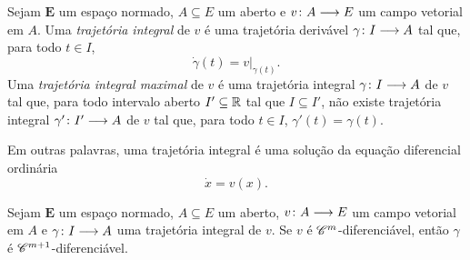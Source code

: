 \begin{definition}
Sejam $\bm E$ um espaço normado, $A \subseteq E$ um aberto e ${v}\colon {A} \longrightarrow {E}$ um campo vetorial em $A$. Uma \emph{trajetória integral} de $v$ é uma trajetória derivável ${\gamma}\colon {I} \longrightarrow {A}$ tal que, para todo $t \in I$,
	\begin{equation*}
	\dot \gamma(t) = v|_{\gamma(t)}.
	\end{equation*}
Uma \emph{trajetória integral maximal} de $v$ é uma trajetória integral ${\gamma}\colon {I} \longrightarrow {A}$ de $v$ tal que, para todo intervalo aberto $I' \subseteq \mathbb{R}$ tal que $I \subseteq I'$, não existe trajetória integral ${\gamma'}\colon {I'} \longrightarrow {A}$ de $v$ tal que, para todo $t \in I$, $\gamma'(t) = \gamma(t)$.
\end{definition}

Em outras palavras, uma trajetória integral é uma solução da equação diferencial ordinária
	\begin{equation*}
	\dot x = v(x).
	\end{equation*}

\begin{proposition}
Sejam $\bm E$ um espaço normado, $A \subseteq E$ um aberto, ${v}\colon {A} \longrightarrow {E}$ um campo vetorial em $A$ e ${\gamma}\colon {I} \longrightarrow {A}$ uma trajetória integral de $v$. Se $v$ é $\mathscr{C}^m$-diferenciável, então $\gamma$ é $\mathscr{C}^{m+1}$-diferenciável.
\end{proposition}













